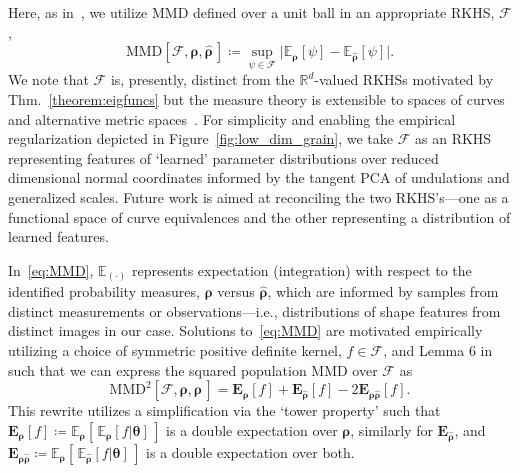 \documentclass[pdflatex,iicol]{sn-jnl}%
\theoremstyle{thmstyleone}%
\theoremstyle{thmstyletwo}%
\theoremstyle{thmstylethree}%
\begin{document}
Here, as in~\cite{gretton2012kernel}, we utilize MMD defined over a unit ball in an appropriate RKHS, $\mathcal{F}$, 
\begin{equation} \label{eq:MMD}
    \text{MMD}[\mathcal{F},\boldsymbol{\rho},\widehat{\boldsymbol{\rho}}\,] \coloneqq \sup_{\psi \in \mathcal{F}} \vert \mathbb{E}_{\boldsymbol{\rho}}[\psi] - \mathbb{E}_{ \widehat{\boldsymbol{\rho}}}[\psi] \vert.
\end{equation}
We note that $\mathcal{F}$ is, presently, distinct from the $\mathbb{R}^d$-valued RKHSs motivated by Thm.~\ref{theorem:eigfuncs} but the measure theory is extensible to spaces of curves and alternative metric spaces~\cite{zhang2022nonparametric, RizzoDISCO2010}. For simplicity and enabling the empirical regularization depicted in Figure~\ref{fig:low_dim_grain}, we take $\mathcal{F}$ as an RKHS representing features of `learned' parameter distributions over reduced dimensional normal coordinates informed by the tangent PCA of undulations and generalized scales. Future work is aimed at reconciling the two RKHS's---one as a functional space of curve equivalences and the other representing a distribution of learned features.

In~\eqref{eq:MMD}, $\mathbb{E}_{(\cdot)}$ represents expectation (integration) with respect to the identified probability measures, $\boldsymbol{\rho}$ versus $\widehat{\boldsymbol{\rho}}$, which are informed by samples from distinct measurements or observations---i.e., distributions of shape features from distinct images in our case. Solutions to~\eqref{eq:MMD} are motivated empirically utilizing a choice of symmetric positive definite kernel, $f \in \mathcal{F}$, and Lemma 6 in~\cite{gretton2012kernel} such that we can express the squared population MMD over $\mathcal{F}$ as
\begin{equation}
    \text{MMD}^2[\mathcal{F},\boldsymbol{\rho},\widehat{\boldsymbol{\rho}}\,] = \boldsymbol{E}_{\boldsymbol{\rho}}[f] + \boldsymbol{E}_{\widehat{\boldsymbol{\rho}}}[f] - 2\boldsymbol{E}_{\boldsymbol{\rho}\widehat{\boldsymbol{\rho}}}[f].
\end{equation}
This rewrite utilizes a simplification via the `tower property' such that $\boldsymbol{E}_{\boldsymbol{\rho}}[f] \coloneqq \mathbb{E}_{\boldsymbol{\rho}}[\,\mathbb{E}_{\boldsymbol{\rho}}[f\vert \boldsymbol{\theta}]\,]$ is a double expectation over $\boldsymbol{\rho}$, similarly for $\boldsymbol{E}_{\widehat{\boldsymbol{\rho}}}$, and $\boldsymbol{E}_{\boldsymbol{\rho}\widehat{\boldsymbol{\rho}}} \coloneqq \mathbb{E}_{\boldsymbol{\rho}}[\,\mathbb{E}_{\widehat{\boldsymbol{\rho}}}[f\vert \boldsymbol{\theta}]\,]$ is a double expectation over both.
\end{document}
